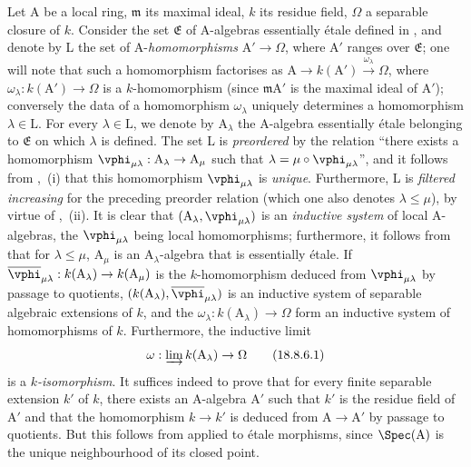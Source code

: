 \begin{env}[18.8.6]
\label{IV.18.8.6}
Let A be a local ring, $\mathfrak{m}$ its maximal ideal, $k$ its residue field, $\Omega$ a separable closure of $k$.
Consider the set $\mathfrak{E}$ of A-algebras essentially \'{e}tale defined in , and denote by L the set of A-\emph{homomorphisms} $\mathrm{A}'\to\Omega$, where $\mathrm{A}'$ ranges over $\mathfrak{E}$;
one will note that such a homomorphism factorises as $\mathrm{A}\to k(\mathrm{A}')\xrightarrow{\omega_\lambda}\Omega$, where $\omega_\lambda:k(\mathrm{A}')\to\Omega$ is a $k$-homomorphism (since $\mathfrak{m}\mathrm{A}'$ is the maximal ideal of $\mathrm{A}'$);
conversely the data of a homomorphism $\omega_\lambda$ uniquely determines a homomorphism $\lambda\in\mathrm{L}$.
For every $\lambda\in\mathrm{L}$, we denote by $\mathrm{A}_\lambda$ the A-algebra essentially \'{e}tale belonging to $\mathfrak{E}$ on which $\lambda$ is defined.
The set L is \emph{preordered} by the relation ``there exists a homomorphism $\vphi_{\mu\lambda}:\mathrm{A}_\lambda\to\mathrm{A}_\mu$ such that $\lambda=\mu\circ\vphi_{\mu\lambda}$'', and it follows from ,~(i) that this homomorphism $\vphi_{\mu\lambda}$ is \emph{unique}.
Furthermore, L is \emph{filtered increasing} for the preceding preorder relation (which one also denotes $\lambda\leq\mu$), by virtue
of ,~(ii).
It is clear that $(\mathrm{A}_\lambda,\vphi_{\mu\lambda})$ is an \emph{inductive system} of local A-algebras, the $\vphi_{\mu\lambda}$ being local homomorphisms;
furthermore, it follows from  that for $\lambda\leq\mu$, $\mathrm{A}_\mu$ is an $\mathrm{A}_\lambda$-algebra that is essentially \'{e}tale.
If $\overline{\vphi}_{\mu\lambda}:k(\mathrm{A}_\lambda)\to k(\mathrm{A}_\mu)$ is the $k$-homomorphism deduced from $\vphi_{\mu\lambda}$ by passage to quotients, $(k(\mathrm{A}_\lambda),\overline{\vphi}_{\mu\lambda})$ is an inductive system of separable algebraic extensions of $k$, and the $\omega_\lambda:k(\mathrm{A}_\lambda)\to\Omega$ form an inductive system of homomorphisms of $k$.
Furthermore, the inductive limit
\begin{equation}
  \omega:\varinjlim k(\mathrm{A}_\lambda)\to\Omega
  \tag{18.8.6.1}
\end{equation}
is a $k$\emph{-isomorphism}.
It suffices indeed to prove that for every finite separable extension $k'$ of $k$, there exists an A-algebra $\mathrm{A}'$ such that $k'$ is the residue field of $\mathrm{A}'$ and that the homomorphism $k\to k'$ is deduced from $\mathrm{A}\to\mathrm{A}'$ by passage to quotients.
But this follows from  applied to \'{e}tale morphisms, since $\Spec(\mathrm{A})$ is the unique neighbourhood of its closed point.


\end{env}
